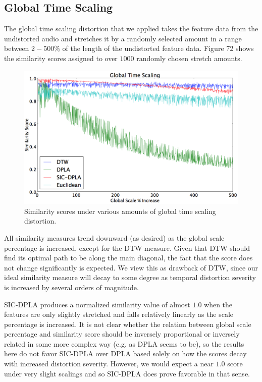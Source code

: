 \documentclass[12pt]{report} 	%
\numberwithin{figure}{chapter}
\numberwithin{table}{chapter}
\numberwithin{equation}{chapter}
\begin{document}
\begin{flushleft}
\subsection{Global Time Scaling}
The global time scaling distortion that we applied takes the feature data from the undistorted audio and stretches it by a randomly selected amount in a range between $2-500\%$ of the length of the undistorted feature data. Figure 72 shows the similarity scores assigned to over $1000$ randomly chosen stretch amounts.
\vspace{12pt}
\begin{figure}[h!]
\begin{center}
\includegraphics[scale=0.5,width=\linewidth]{GlobalTimeScaling}
\caption[Global time scaling results]{Similarity scores under various amounts of global time scaling distortion.}
\end{center}
\end{figure}
All similarity measures trend downward (as desired) as the global scale percentage is increased, except for the DTW measure. Given that DTW should find its optimal path to be along the main diagonal, the fact that the score does not change significantly is expected. We view this as drawback of DTW, since our ideal similarity measure will decay to some degree as temporal distortion severity is increased by several orders of magnitude.

SIC-DPLA produces a normalized similarity value of almost $1.0$ when the features are only slightly stretched and falls relatively linearly as the scale percentage is increased. It is not clear whether the relation between global scale percentage and similarity score should be inversely proportional or inversely related in some more complex way (e.g. as DPLA seems to be), so the results here do not favor SIC-DPLA over DPLA based solely on how the scores decay with increased distortion severity. However, we would expect a near $1.0$ score under very slight scalings and so SIC-DPLA does prove favorable in that sense.


\end{flushleft}
\end{document}
